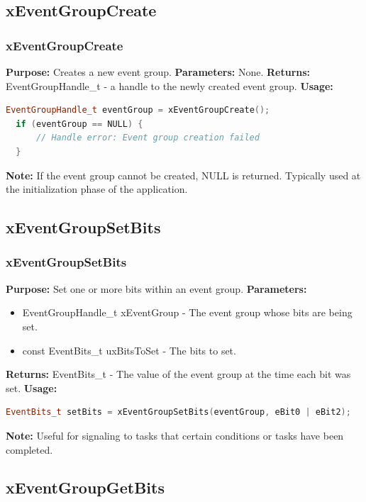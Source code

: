 \documentclass[10pt]{beamer}
\begin{document}
\subsection{xEventGroupCreate}
\begin{frame}[fragile]
    \frametitle{xEventGroupCreate}
    \textbf{Purpose:} Creates a new event group.
    \textbf{Parameters:} None.
    \textbf{Returns:} EventGroupHandle\_t - a handle to the newly created event group.
    \textbf{Usage:}
    \begin{lstlisting}[language=C++, basicstyle=\ttfamily\small]
  EventGroupHandle_t eventGroup = xEventGroupCreate();
  if (eventGroup == NULL) {
      // Handle error: Event group creation failed
  }
    \end{lstlisting}
    \textbf{Note:} If the event group cannot be created, NULL is returned. Typically used at the initialization phase of the application.
\end{frame}

\subsection{xEventGroupSetBits}
\begin{frame}[fragile]
    \frametitle{xEventGroupSetBits}
    \textbf{Purpose:} Set one or more bits within an event group.
    \textbf{Parameters:}
    \begin{itemize}
      \item EventGroupHandle\_t xEventGroup - The event group whose bits are being set.
      \item const EventBits\_t uxBitsToSet - The bits to set.
    \end{itemize}
    \textbf{Returns:} EventBits\_t - The value of the event group at the time each bit was set.
    \textbf{Usage:}
    \begin{lstlisting}[language=C++, basicstyle=\ttfamily\small]
  EventBits_t setBits = xEventGroupSetBits(eventGroup, eBit0 | eBit2);
    \end{lstlisting}
    \textbf{Note:} Useful for signaling to tasks that certain conditions or tasks have been completed.
  \end{frame}

\subsection{xEventGroupGetBits}
\end{document}
